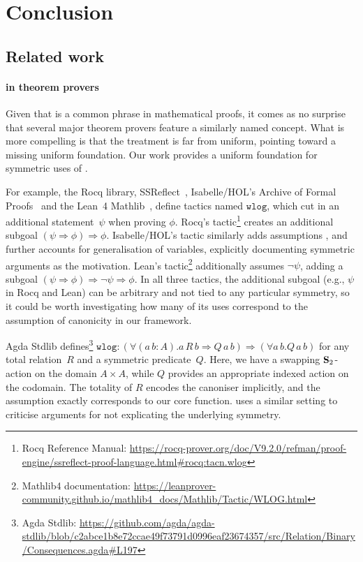 \section{Conclusion}

\subsection{Related work}

\paragraph{\wLOG in theorem provers}

Given that \WLOG is a common phrase in mathematical proofs, it comes
as no surprise that several major theorem provers feature a similarly
named concept. What is more compelling is that the treatment is far
from uniform, pointing toward a missing uniform foundation. Our
work provides a uniform foundation for symmetric uses of \WLOG{}.

For example, the Rocq library, SSReflect~\cite{ssreflect}, Isabelle/HOL's Archive of Formal Proofs~\cite{unruh:wlog-archive-of-formal-proofs} and the
Lean~4 Mathlib~\cite{lean-mathlib}, define tactics named
$\mathtt{wlog}$, which cut in an additional statement~$\psi$ when proving
$\phi$. Rocq's tactic\footnote{%
  Rocq Reference Manual:
  \tiny\url{https://rocq-prover.org/doc/V9.2.0/refman/proof-engine/ssreflect-proof-language.html\#rocq:tacn.wlog}%
}
%
creates an additional subgoal $(\psi \Rightarrow \phi) \Rightarrow
\phi$.  Isabelle/HOL's tactic similarly adds assumptions \WLOG{}, and
further accounts for generalisation of variables, explicitly
documenting symmetric arguments as the motivation.
Lean's tactic\footnote{%
  Mathlib4 documentation:
  \tiny\url{https://leanprover-community.github.io/mathlib4_docs/Mathlib/Tactic/WLOG.html}
}
%
additionally assumes $\lnot \psi$, adding a subgoal $(\psi \Rightarrow
\phi) \Rightarrow \lnot \psi \Rightarrow \phi$. In all three tactics, the
additional subgoal (e.g., $\psi$ in Rocq and Lean) can be arbitrary and not tied to any
particular symmetry, so it could be worth investigating how many of
its uses correspond to the assumption of canonicity in our framework.

Agda Stdlib defines\footnote{%
  Agda Stdlib:
  \tiny\url{https://github.com/agda/agda-stdlib/blob/c2abce1b8e72ccae49f73791d0996eaf23674357/src/Relation/Binary/Consequences.agda\#L197}
}
%
$\mathtt{wlog} : (\forall (a\, b : A). a \, R \, b \Rightarrow Q \, a
\, b) \Rightarrow (\forall a\, b. Q \, a \, b )$ for any total
relation~$R$ and a symmetric predicate~$Q$. Here, we have a swapping
$\mathbf{S}_{2}$-action on the domain $A \times A$, while $Q$ provides an
appropriate indexed action on the codomain. The
totality of $R$
encodes the canoniser
implicitly, and the assumption exactly
corresponds to our core function.
\citet{dijkstra:wlog} uses a similar setting to criticise \WLOG arguments
for not explicating the underlying symmetry.

